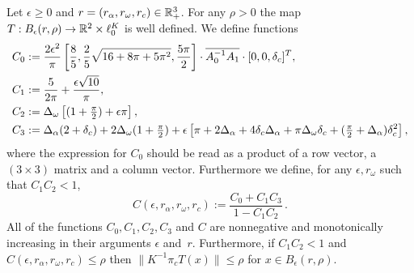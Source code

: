 \begin{proposition}
	Let $\epsilon\geq 0$ and  $r=(r_\alpha,r_\omega,r_c) \in \mathbb{R}^3_+$. 
	For any $ \rho > 0$ the map 
	 $T:B_{\epsilon}(r,\rho) \to \mathbb{R}^2 \times \ell^K_0 $ is well defined. 	
	We define functions 
	\begin{alignat*}{1}
	C_0 &:=  \frac{2 \epsilon^2}{\pi} 
	\left[
	\frac{8}{5},\frac{2}{5} \sqrt{16+ 8\pi + 5 \pi^2},\frac{5 \pi }{2} 
	\right]
	\cdot \overline{A_0^{-1} A_1} \cdot [0,0 , \delta_c ]^T ,
	\\
	C_1 &:= \frac{5 }{2 \pi} + \frac{\epsilon \sqrt{10}}{\pi}, \\
	C_2 &:= \Delta_\omega  \left[  (1 + \tfrac{\pi}{2}) + \epsilon \pi  \right] , \\
	C_3 &:=  
	\Delta_\alpha (2+ \delta_c) +	2 \Delta_\omega (1+\tfrac{\pi}{2}) 
		+ \epsilon \left[ \pi + 2\Delta_\alpha  + 4 \delta_c \Delta_\alpha + \pi \Delta_\omega \delta_c  + (\tfrac{\pi}{2} + \Delta_\alpha ) \delta_c^2 \right] ,
	\end{alignat*}
where the expression for $C_0$ should be read as a product of a row vector, a $(3 \times 3)$ matrix and a column vector.
Furthermore we define, for any $\epsilon,r_\omega$ such that $C_1 C_2 <1$,
	\begin{equation}
		C(\epsilon,r_\alpha,r_\omega,r_c) := \frac{C_0+ C_1 C_3}{1 - C_1 C_2}
		 \, .
		\label{eq:RhoConstant}
	\end{equation}
	All of the functions $C_0,C_1,C_2,C_3$ and $C$ are nonnegative and monotonically increasing in their arguments $\epsilon$ and~$r$. 
	Furthermore, if  $C_1 C_2 < 1$ and $	C(\epsilon,r_\alpha,r_\omega,r_c) \leq \rho $
	then $\| K^{-1} \pi_c  T( x) \| \leq \rho $
	for $x \in B_{\epsilon}(r,\rho)$. 
	\label{prop:DerivativeEndo}
\end{proposition}

